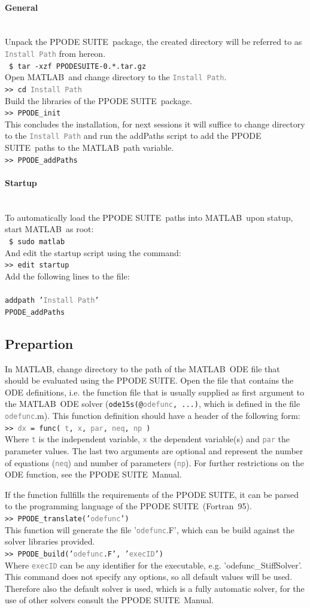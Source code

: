 \documentclass[a4paper,10pt,twocolumn]{article}
\newcommand{\PPODESUITE}{PPODE SUITE}
\newcommand{\MATLAB}{MATLAB}
\newcommand{\Fortran}{Fortran}
\newcommand{\shellcmd}[1]{\\\indent~\texttt{\footnotesize \$ #1}\\}
\newcommand{\matlabcmd}[1]{\\\indent\texttt{\footnotesize >> #1}\\}
\newcommand{\matlabcmdinline}[1]{\textacutedbl\texttt{\footnotesize#1}\textgravedbl}
\newcommand{\ph}[1]{\texttt{\footnotesize \textcolor{gray}{\textlangle #1\textrangle}}}
\begin{document}
\paragraph{General}\mbox{}\\
Unpack the \PPODESUITE~package, the created directory will be referred to as \ph{Install Path} from hereon.
\shellcmd{tar -xzf PPODESUITE-0.*.tar.gz}
Open \MATLAB~and change directory to the \ph{Install Path}.
\matlabcmd{cd \ph{Install Path}}
Build the libraries of the \PPODESUITE~package.
\matlabcmd{PPODE\_init}
This concludes the installation, for next sessions it will suffice to change directory to the \ph{Install Path} and run the addPaths script to add the \PPODESUITE~paths to the \MATLAB~path variable.
\matlabcmd{PPODE\_addPaths}

\paragraph{Startup}\mbox{}\\
To automatically load the \PPODESUITE~paths into \MATLAB~upon statup, start \MATLAB~as root:
\shellcmd{sudo matlab}
And edit the startup script using the command:
\matlabcmd{edit startup}
Add the following lines to the file:\\\\
\texttt{\small{addpath '\ph{Install Path}'\\
PPODE\_addPaths}}

\subsection*{Prepartion}
In \MATLAB, change directory to the path of the \MATLAB~ODE file that should be evaluated using the \PPODESUITE. Open the file that contains the ODE definitions, i.e. the function file that is usually supplied as first argument to the \MATLAB~ODE solver (\matlabcmdinline{ode15s(@\ph{odefunc}, ...)}, which is defined in the file \ph{odefunc}.m). This function definition should have a header of the following form:
\matlabcmd{\ph{dx} = func( \ph{t}, \ph{x}, \ph{par}, \ph{neq}, \ph{np} )}
Where \ph{t} is the independent variable, \ph{x} the dependent variable(s) and \ph{par} the parameter values. The last two arguments are optional and represent the number of equations (\ph{neq}) and number of parameters (\ph{np}). For further restrictions on the ODE function, see the \PPODESUITE~Manual.

If the function fullfills the requirements of the \PPODESUITE, it can be parsed to the programming language of the \PPODESUITE~(\Fortran~95).
\matlabcmd{PPODE\_translate('\ph{odefunc}')}
This function will generate the file '\ph{odefunc}.F', which can be build against the solver libraries provided.
\matlabcmd{PPODE\_build('\ph{odefunc}.F', '\ph{execID}')}
Where \ph{execID} can be any identifier for the executable, e.g. 'odefunc\_StiffSolver'. This command does not specify any options, so all default values will be used. Therefore also the default solver is used, which is a fully automatic solver, for the use of other solvers consult the \PPODESUITE~Manual.
\end{document}
